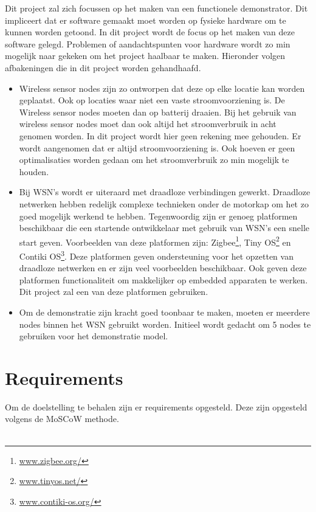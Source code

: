 \documentclass{../local}
\begin{document}
Dit project zal zich focussen op het maken van een functionele demonstrator. Dit impliceert dat er software gemaakt moet worden op fysieke hardware om te kunnen worden getoond. In dit project wordt de focus op het maken van deze software gelegd. Problemen of aandachtspunten voor hardware wordt zo min mogelijk naar gekeken om het project haalbaar te maken. Hieronder volgen afbakeningen die in dit project worden gehandhaafd.

\begin{itemize}
\item Wireless sensor nodes zijn zo ontworpen dat deze op elke locatie kan worden geplaatst. Ook op locaties waar niet een vaste stroomvoorziening is. De Wireless sensor nodes moeten dan op batterij draaien. Bij het gebruik van wireless sensor nodes moet dan ook altijd het stroomverbruik in acht genomen worden. In dit project wordt hier geen rekening mee gehouden. Er wordt aangenomen dat er altijd stroomvoorziening is. Ook hoeven er geen optimalisaties worden gedaan om het stroomverbruik zo min mogelijk te houden.
\item Bij WSN's wordt er uiteraard met draadloze verbindingen gewerkt. Draadloze netwerken hebben redelijk complexe technieken onder de motorkap om het zo goed mogelijk werkend te hebben. Tegenwoordig zijn er genoeg platformen beschikbaar die een startende ontwikkelaar met gebruik van WSN's een snelle start geven. Voorbeelden van deze platformen zijn: Zigbee\footnote{\url{www.zigbee.org/}}, Tiny OS\footnote{\url{www.tinyos.net/}} en Contiki OS\footnote{\url{www.contiki-os.org/}}. Deze platformen geven ondersteuning voor het opzetten van draadloze netwerken en er zijn veel voorbeelden beschikbaar. Ook geven deze platformen functionaliteit om makkelijker op embedded apparaten te werken. Dit project zal een van deze platformen gebruiken. 
\item Om de demonstratie zijn kracht goed toonbaar te maken, moeten er meerdere nodes binnen het WSN gebruikt worden. Initieel wordt gedacht om 5 nodes te gebruiken voor het demonstratie model.
\end{itemize}

\section{Requirements}
Om de doelstelling te behalen zijn er requirements opgesteld. Deze zijn opgesteld volgens de MoSCoW methode. 
\\\\
\end{document}
